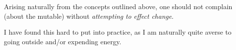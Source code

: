 \documentclass[../butidigress.tex]{subfiles}
\begin{document}
Arising naturally from the concepts outlined above, one should not complain (about the mutable) without \emph{attempting to effect change}.

I have found this hard to put into practice, as I am naturally quite averse to going outside and/or expending energy.
\end{document}
